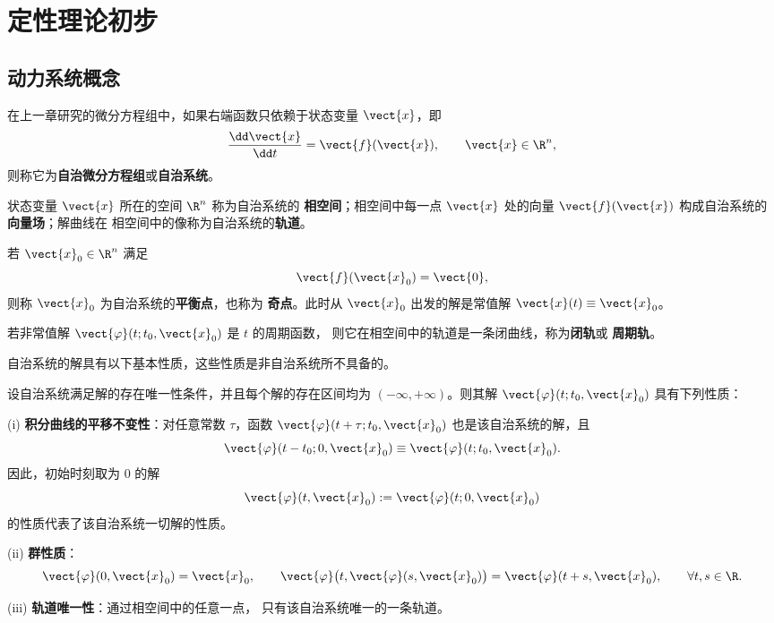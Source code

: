 \setchapterintro{}
\chapter{定性理论初步}

\section{动力系统概念}\label{sec:动力系统概念}

在上一章研究的微分方程组中，如果右端函数只依赖于状态变量
$\vect{x}$，即
\[
	\dfrac{\dd\vect{x}}{\dd t}=\vect{f}(\vect{x}),
	\qquad \vect{x}\in\R^n,
\]
则称它为\textbf{自治微分方程组}或\textbf{自治系统}。

\begin{definition}\label{def:相空间向量场与轨道}
	状态变量 $\vect{x}$ 所在的空间 $\R^n$ 称为自治系统的
	\textbf{相空间}；相空间中每一点 $\vect{x}$ 处的向量
	$\vect{f}(\vect{x})$ 构成自治系统的\textbf{向量场}；解曲线在
	相空间中的像称为自治系统的\textbf{轨道}。
\end{definition}

\begin{definition}\label{def:平衡点与闭轨}
	若 $\vect{x}_0\in\R^n$ 满足
	\[
		\vect{f}(\vect{x}_0)=\vect{0},
	\]
	则称 $\vect{x}_0$ 为自治系统的\textbf{平衡点}，也称为
	\textbf{奇点}。此时从 $\vect{x}_0$ 出发的解是常值解
	$\vect{x}(t)\equiv\vect{x}_0$。

	若非常值解 $\vect{\varphi}(t;t_0,\vect{x}_0)$ 是 $t$ 的周期函数，
	则它在相空间中的轨道是一条闭曲线，称为\textbf{闭轨}或
	\textbf{周期轨}。
\end{definition}

自治系统的解具有以下基本性质，这些性质是非自治系统所不具备的。

\begin{proposition}\label{thm:自治系统解的基本性质}
	设自治系统满足解的存在唯一性条件，并且每个解的存在区间均为
	$(-\infty,+\infty)$。则其解
	$\vect{\varphi}(t;t_0,\vect{x}_0)$ 具有下列性质：

	\textnormal{(i)} \textbf{积分曲线的平移不变性}：对任意常数
	$\tau$，函数
	$\vect{\varphi}(t+\tau;t_0,\vect{x}_0)$ 也是该自治系统的解，且
	\[
		\vect{\varphi}(t-t_0;0,\vect{x}_0)
		\equiv\vect{\varphi}(t;t_0,\vect{x}_0).
	\]
	因此，初始时刻取为 $0$ 的解
	\[
		\vect{\varphi}(t,\vect{x}_0)
		\mathrel{:=}\vect{\varphi}(t;0,\vect{x}_0)
	\]
	的性质代表了该自治系统一切解的性质。

	\textnormal{(ii)} \textbf{群性质}：
	\[
		\vect{\varphi}(0,\vect{x}_0)=\vect{x}_0,
		\qquad
		\vect{\varphi}\bigl(t,\vect{\varphi}(s,\vect{x}_0)\bigr)
		=\vect{\varphi}(t+s,\vect{x}_0),
		\qquad \forall t,s\in\R.
	\]

	\textnormal{(iii)} \textbf{轨道唯一性}：通过相空间中的任意一点，
	只有该自治系统唯一的一条轨道。
\end{proposition}

